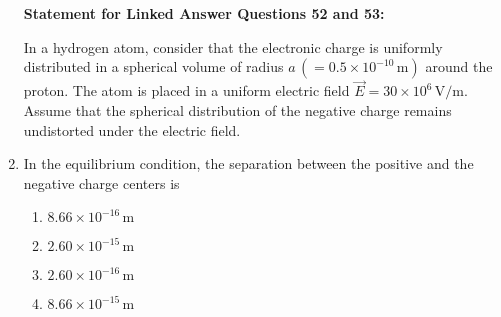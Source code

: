 \documentclass[article]{IEEEtran}
\numberwithin{figure}{enumi}
\begin{document}
\begin{enumerate}
  
\textbf{Statement for Linked Answer Questions 52 and 53:}

In a hydrogen atom, consider that the electronic charge is uniformly distributed in a spherical volume of radius $a \, (= 0.5 \times 10^{-10} \, \text{m})$ around the proton. The atom is placed in a uniform electric field $\vec{E} = 30 \times 10^6 \, \text{V/m}$. Assume that the spherical distribution of the negative charge remains undistorted under the electric field.


    \item In the equilibrium condition, the separation between the positive and the negative charge centers is
    \begin{enumerate}
        \item $8.66 \times 10^{-16} \, \text{m}$
        \item $2.60 \times 10^{-15} \, \text{m}$
        \item $2.60 \times 10^{-16} \, \text{m}$
        \item $8.66 \times 10^{-15} \, \text{m}$
    \end{enumerate}
\par
\end{enumerate}
\end{document}
